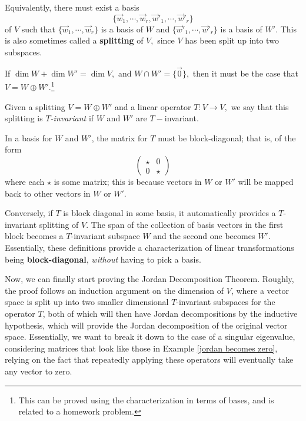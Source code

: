Equivalently, there must exist a basis \[
\{\vec{w}_1, \cdots, \vec{w}_r, \vec{w}'_1, \cdots, \vec{w}'_r\}
\]
of $V$ such that 
$\{\vec{w}_1, \cdots, \vec{w}_r\}$ is a basis of $W$ and $\{\vec{w}'_1, \cdots, \vec{w}'_r\}$ is a basis of $W'$. This is also sometimes called a \textbf{splitting} of $V,$ since $V$ has been split up into two subspaces.

\begin{theorem}\label{splitting thm}
If $\dim W + \dim W' = \dim V,$ and $W \cap W' = \{\vec{0}\},$ then it must be the case that $V = W \oplus W'.$\footnote{This can be proved using the characterization in terms of bases, and is related to a homework problem.}
\end{theorem}


\begin{definition}
Given a splitting $V = W \oplus W'$ and a linear operator $T: V \rightarrow V,$ we say that this splitting is \emph{$T$-invariant} if $W$ and $W'$ are $T-$invariant. 
\end{definition}

In a basis for $W$ and $W'$, the matrix for $T$ must be block-diagonal; that is, of the form
\[
\begin{pmatrix}
\star & 0 \\
0 & \star
\end{pmatrix}
\]
where each $\star$ is some matrix; this is because vectors in $W$ or $W'$ will be mapped back to other vectors in $W$ or $W'.$ 

Conversely, if $T$ is block diagonal in some basis, it automatically provides a $T$-invariant splitting of $V.$ The span of the collection of basis vectors in the first block becomes a $T$-invariant subspace $W$ and the second one becomes $W'.$ Essentially, these definitions provide a characterization of linear transformations being \textbf{block-diagonal}, \emph{without} having to pick a basis. 


Now, we can finally start proving the Jordan Decomposition Theorem. Roughly, the proof follows an induction argument on the dimension of $V$, where a vector space is split up into two smaller dimensional $T$-invariant subspaces for the operator $T$, both of which will then have Jordan decompositions by the inductive hypothesis, which will provide the Jordan decomposition of the original vector space. Essentially, we want to break it down to the case of a singular eigenvalue, considering matrices that look like those in Example \ref{jordan becomes zero}, relying on the fact that repeatedly applying these operators will eventually take any vector to zero. 


